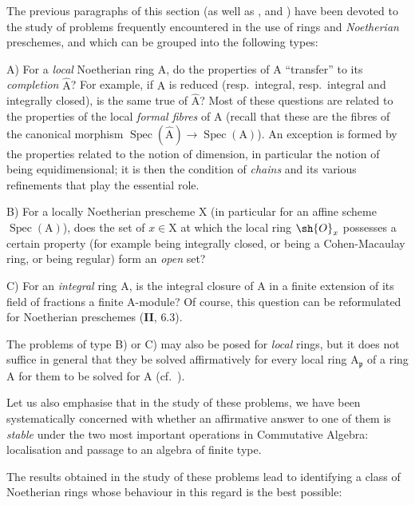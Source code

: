 \begin{env}[7.8.1]
\label{IV.7.8.1}
The previous paragraphs of this section (as well as ,  and ) have been devoted to the study of problems frequently encountered in the use of rings and \emph{Noetherian} preschemes, and which can be grouped into the following types:


A) For a \emph{local} Noetherian ring $\mathrm{A}$, do the properties of $\mathrm{A}$ ``transfer'' to its \emph{completion} $\widehat{\mathrm{A}}$? For example, if $\mathrm{A}$ is reduced (resp.\ integral, resp.\ integral and integrally closed), is the same true of $\widehat{\mathrm{A}}$? Most of these questions are related to the properties of the local \emph{formal fibres} of $\mathrm{A}$ (recall that these are the fibres of the canonical morphism $\operatorname{Spec}(\widehat{\mathrm{A}})\to\operatorname{Spec}(\mathrm{A})$). An exception is formed by the properties related to the notion of dimension, in particular the notion of being equidimensional; it is then the condition of \emph{chains} and its various refinements that play the essential role.

B) For a locally Noetherian prescheme $\mathrm{X}$ (in particular for an affine scheme $\operatorname{Spec}(\mathrm{A})$), does the set of $x\in\mathrm{X}$ at which the local ring $\sh{O}_x$ possesses a certain property (for example being integrally closed, or being a Cohen-Macaulay ring, or being regular) form an \emph{open} set?

C) For an \emph{integral} ring $\mathrm{A}$, is the integral closure of $\mathrm{A}$ in a finite extension of its field of fractions a finite $\mathrm{A}$-module? Of course, this question can be reformulated for Noetherian preschemes (\textbf{II}, $6.3$).

The problems of type B) or C) may also be posed for \emph{local} rings, but it does not suffice in general that they be solved affirmatively for every local ring $\mathrm{A}_\mathfrak{p}$ of a ring $\mathrm{A}$ for them to be solved for $\mathrm{A}$ (cf.\ ).

Let us also emphasise that in the study of these problems, we have been systematically concerned with whether an affirmative answer to one of them is \emph{stable} under the two most important operations in Commutative Algebra: localisation and passage to an algebra of finite type.

The results obtained in the study of these problems lead to identifying a class of Noetherian rings whose behaviour in this regard is the best possible:
\end{env}

